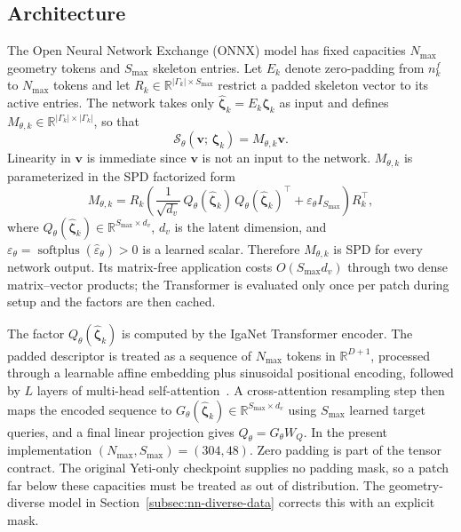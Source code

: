 \documentclass{article}
\newcommand{\vect}[1]{\boldsymbol{#1}}
\newcommand{\R}{\mathbb{R}}
\newcommand{\skel}{\Gamma} %
\newcommand{\Snn}{\mathcal{S}_{\theta}}          %
\newcommand{\dv}{d_v}                             %
\theoremstyle{plain}
\numberwithin{equation}{section}
\begin{document}
\subsection{Architecture}
\label{subsec:architecture}

The Open Neural Network Exchange (ONNX) model has fixed capacities
$N_{\max}$ geometry tokens and
$S_{\max}$ skeleton entries.  Let $E_k$ denote zero-padding from $n_k^f$ to
$N_{\max}$ tokens and let $R_k\in\R^{|\skel_k|\times S_{\max}}$ restrict a
padded skeleton vector to its active entries.  The network takes only
$\widehat{\vect{\zeta}}_k=E_k\vect{\zeta}_k$ as input and defines
$M_{\theta,k}\in\R^{|\skel_k|\times|\skel_k|}$, so that
\begin{equation}
    \Snn(\vect{v};\,\vect{\zeta}_k) = M_{\theta,k}\vect{v}.
    \label{eq:matrix-form}
\end{equation}
Linearity in $\vect{v}$ is immediate since $\vect{v}$ is not an input to the
network.
$M_{\theta,k}$ is parameterized in the SPD factorized form
\begin{equation}
    M_{\theta,k}
    =R_k\left(
    \frac{1}{\sqrt{\dv}}\,
    Q_\theta(\widehat{\vect{\zeta}}_k)\,
    Q_\theta(\widehat{\vect{\zeta}}_k)^{\top}
    + \varepsilon_\theta I_{S_{\max}}\right)R_k^\top,
    \label{eq:spd-param}
\end{equation}
where $Q_\theta(\widehat{\vect{\zeta}}_k)\in
    \R^{S_{\max}\times\dv}$, $\dv$ is the latent dimension, and
$\varepsilon_\theta=\operatorname{softplus}(\widehat\varepsilon_\theta)>0$
is a learned scalar.  Therefore $M_{\theta,k}$ is SPD for every network
output.  Its matrix-free application costs $O(S_{\max}\dv)$ through two
dense matrix--vector products; the Transformer is evaluated only once per
patch during setup and the factors are then cached.

The factor $Q_\theta(\widehat{\vect{\zeta}}_k)$ is computed by the IgaNet
Transformer encoder.  The padded descriptor is treated as a sequence of
$N_{\max}$ tokens in $\R^{D+1}$, processed through a learnable affine
embedding plus sinusoidal positional encoding,
followed by $L$ layers of multi-head self-attention~\cite{vaswani2017attention}.
A cross-attention resampling step then maps the encoded sequence to
$G_\theta(\widehat{\vect{\zeta}}_k)\in\R^{S_{\max}\times\dv}$ using
$S_{\max}$ learned target queries, and a final linear projection gives
$Q_\theta=G_\theta W_Q$.  In the present implementation
$(N_{\max},S_{\max})=(304,48)$.  Zero padding is part of the tensor contract.
The original Yeti-only checkpoint supplies no padding mask, so a patch far
below these capacities must be treated as out of distribution.  The
geometry-diverse model in Section~\ref{subsec:nn-diverse-data} corrects this
with an explicit mask.
\end{document}
